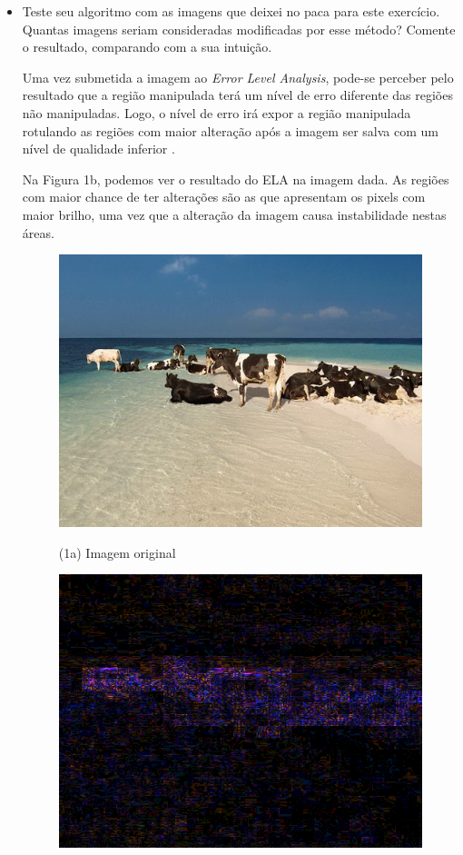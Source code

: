 \documentclass[12pt]{article}
\begin{document}
\begin{itemize}
\begin{itemize}
\item Teste seu algoritmo com as imagens que deixei no paca para este exercício. 
Quantas imagens seriam consideradas modificadas por esse método? Comente o resultado,
comparando com a sua intuição.

Uma vez submetida a imagem ao \textit{Error Level Analysis}, pode-se perceber pelo resultado que 
a região manipulada terá um nível de erro diferente das regiões não manipuladas. Logo, 
o nível de erro irá expor a região manipulada rotulando as regiões com maior alteração após
a imagem ser salva com um nível de qualidade inferior \cite{krawetz}.

Na Figura 1b, podemos ver o resultado do ELA na imagem dada. As regiões com maior chance de ter
alterações são as que apresentam os pixels com maior brilho, uma vez que a alteração da imagem 
causa instabilidade nestas áreas.
\begin{figure}[htb]
\centering
\begin{minipage}[b]{0.45\textwidth}
	\centering
        \includegraphics[scale=0.3]{Q3Images/cows_on_beach.jpg} 
	\centerline{\label{fig1a} \small (1a) Imagem original}
\end{minipage}
\begin{minipage}[b]{0.45\textwidth}
	\centering
        \includegraphics[scale=0.3]{Q3Images/cows_on_beach_ela.png} 

\end{minipage}
\end{figure}
\end{itemize}
\end{itemize}
\end{document}

